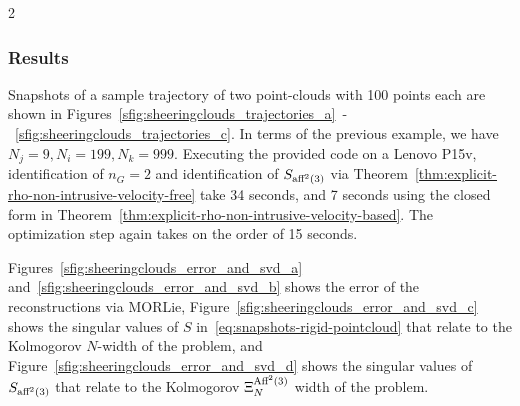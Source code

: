 \documentclass{article}
\begin{document}
\begin{multicols}{2}
\subsubsection{Results}
Snapshots of a sample trajectory of two point-clouds with 100 points each are shown in Figures~\ref{sfig:sheeringclouds_trajectories_a}~-~\ref{sfig:sheeringclouds_trajectories_c}. In terms of the previous example, we have $N_j = 9, N_i  = 199, N_k = 999$. Executing the provided code on a Lenovo P15v, identification of $n_G = 2$ and identification of $S_{\textnormal{aff}^2(3)}$ via Theorem~\ref{thm:explicit-rho-non-intrusive-velocity-free} take 34 seconds, and 7 seconds using the closed form in Theorem~\ref{thm:explicit-rho-non-intrusive-velocity-based}. The optimization step again takes on the order of 15 seconds.

Figures~\ref{sfig:sheeringclouds_error_and_svd_a} and~\ref{sfig:sheeringclouds_error_and_svd_b} shows the error of the reconstructions via MORLie, Figure~\ref{sfig:sheeringclouds_error_and_svd_c} shows the singular values of $S$ in~\eqref{eq:snapshots-rigid-pointcloud} that relate to the Kolmogorov $N$-width of the problem, and Figure~\ref{sfig:sheeringclouds_error_and_svd_d} shows the singular values of $S_{\textnormal{aff}^2(3)}$ that relate to the Kolmogorov $\Xi^{\textnormal{Aff}^2(3)}_N$ width of the problem. 


\end{multicols}
\end{document}
